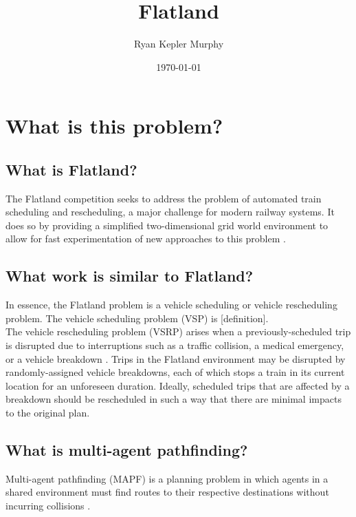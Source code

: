 \documentclass[11pt]{article}
\title{Flatland}
\author{Ryan Kepler Murphy}
\date{\today}
\begin{document}
\maketitle	
\pagebreak

\tableofcontents
\pagebreak


\section{What is this problem?}
\subsection{What is Flatland?}
The Flatland competition seeks to address the problem of automated train scheduling and rescheduling, a major challenge
for modern railway systems. It does so by providing a simplified two-dimensional grid world environment to allow for fast experimentation of new approaches to this problem \cite{monylascscbhwaegeibavistsasp20a}. 

\subsection{What work is similar to Flatland?}
In essence, the Flatland problem is a vehicle scheduling or vehicle rescheduling problem.  The vehicle scheduling problem (VSP) is [definition].   \\

The vehicle rescheduling problem (VSRP) arises when a previously-scheduled trip is disrupted due to interruptions such as a traffic collision, a medical emergency, or a vehicle breakdown \cite{limibo07a}.  Trips in the Flatland environment may be disrupted by randomly-assigned vehicle breakdowns, each of which stops a train in its current location for an unforeseen duration.  Ideally, scheduled trips that are affected by a breakdown should be rescheduled in such a way that there are minimal impacts to the original plan. \\

\subsection{What is multi-agent pathfinding?}
Multi-agent pathfinding (MAPF) is a planning problem in which agents in a shared environment must find routes to their respective destinations without incurring collisions \cite{silver05a}. \\
\end{document}
